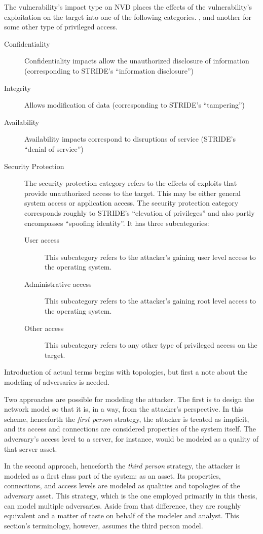 The vulnerability's impact type on NVD places the effects of the vulnerability's
exploitation on the target into one of the following categories.
, and another for some other type of privileged access.
\begin{description}
\item[Confidentiality] Confidentiality impacts allow the unauthorized disclosure 
    of information (corresponding to STRIDE's ``information disclosure'')
\item[Integrity] Allows modification of data (corresponding to STRIDE's ``tampering'')
\item[Availability] Availability impacts correspond to disruptions of service (STRIDE's
    ``denial of service'')
\item[Security Protection] The security protection category refers to the effects
    of exploits that provide unauthorized access to the target. This may be either
    general system access or application access. The security protection category
    corresponds roughly to STRIDE's ``elevation of privileges'' and also partly encompasses
    ``spoofing identity''. It has three subcategories:
    \begin{description}
    \item[User access] This subcategory refers to the attacker's gaining user level access
        to the operating system.
    \item[Administrative access] This subcategory refers to the attacker's gaining root level
        access to the operating system.
    \item[Other access] This subcategory refers to any other type of privileged access on
        the target.
    \end{description}
\end{description}
Introduction of actual terms begins with topologies, but first a note about the modeling
of adversaries is needed. 

Two approaches are possible for modeling the attacker. The first
is to design the network model so that it is, in a way, from the attacker's perspective.
In this scheme, henceforth the \emph{first person} strategy, the attacker is treated as
implicit, and its access and connections are considered properties of the system itself.
The adversary's access level to a server, for instance, would be modeled as a quality of
that server asset.

In the second approach, henceforth the \emph{third person} strategy, the attacker is
modeled as a first class part of the system: as an asset. Its properties, connections,
and access levels are modeled as qualities and topologies of the adversary asset.
This strategy, which is the one employed primarily in this thesis, can model multiple
adversaries. Aside from that difference, they are roughly equivalent and a matter
of taste on behalf of the modeler and analyst. This section's terminology, however,
assumes the third person model.

